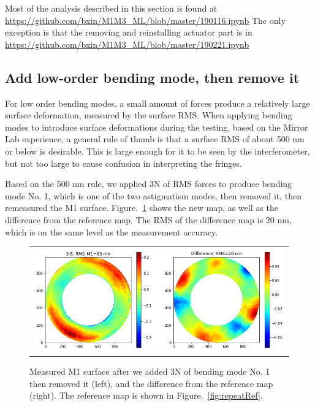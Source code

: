 \documentclass [twoside,openbib,12pt]{article}
\begin{document}
Most of the analysis described in this section is found at
\url{https://github.com/bxin/M1M3_ML/blob/master/190116.ipynb}
The only exception is that the removing and reinstalling actuator part
is in
\url{https://github.com/bxin/M1M3_ML/blob/master/190221.ipynb}

\subsection{Add low-order bending mode, then remove it}
\label{sec:repeatB1}

For low order bending modes, a small amount of forces produce a
relatively large surface deformation, measured by the surface
RMS. When applying bending modes to introduce surface deformations
during the testing, based on the Mirror Lab experience, a general rule of thumb is that a surface RMS of
about 500 nm or below is desirable. This is large enough for it to be seen by
the interferometer, but not too large to cause confusion in
interpreting the fringes.

Based on the 500 nm rule,
we applied 3N of RMS forces to produce bending mode No. 1, which is
one of the two astigmatism modes, then removed it, then remeasured the
M1 surface. Figure.~\ref{fig:repeatB1} shows the new map, as well as the
difference from the reference map. The RMS of the difference map is 20
nm, which is on the same level as the measurement accuracy.

 \begin{figure}[bthp]
   \begin{center}
   \begin{tabular}{c}
\includegraphics[width=120mm]{figures/repeatB1.png}
  \end{tabular}
   \end{center}
   \caption
  { \label{fig:repeatB1}
Measured M1 surface after we added 3N of bending mode No. 1 then
removed it (left), and the difference from the reference map
(right). The reference map is shown in Figure.~\ref{fig:repeatRef}.
 }
\end{figure}
\end{document}
